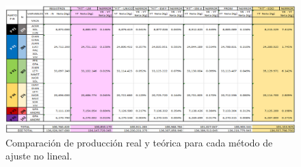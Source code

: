 \pagebreak
\begin{figure}[H]
    \centering
    \includegraphics[angle=90, scale=0.69]{img/prodparamscompare.png}
    \caption{Comparación de producción real y teórica para cada método de ajuste no lineal. \label{prodparamscomparepng}}
\end{figure}
\pagebreak


